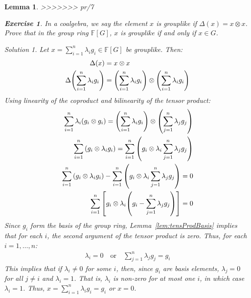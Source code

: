 \documentclass{article}
\newtheorem{Lemma}{Lemma}
\theoremstyle{definition}
\newtheorem{Exercise}{Exercise}
\theoremstyle{remark}
\newtheorem*{Solution*}{Solution}
\theoremstyle{underline}
\theoremstyle{underline}
\begin{document}
\begin{Lemma}
>>>>>>> pr/7
	\begin{Exercise}
		In a coalgebra, we say the element $x$ is grouplike if $\Delta(x) = x \otimes x$. Prove that in the group ring $\mathbb F[G]$, $x$ is grouplike if and only if $x \in G$.
	\end{Exercise}
	\begin{Solution*}
		Let $x = \sum\limits_{i = 1}^n \lambda_i g_i \in \mathbb F[G]$ be grouplike. Then:
		\begin{align*}
			\Delta(x) & = x \otimes x \\
			\Delta\pqty{\sum_{i=1}^n \lambda_i g_i} & = \pqty{\sum_{i=1}^n \lambda_i g_i} \otimes \pqty{\sum_{i=1}^n \lambda_i g_i}
		\end{align*}
		Using linearity of the coproduct and bilinearity of the tensor product:
		\begin{align*}
			\sum_{i=1}^n \lambda_i \pqty{g_i \otimes g_i} = \pqty{\sum_{i=1}^n \lambda_i g_i} \otimes \pqty{\sum_{j=1}^n \lambda_j g_j}\\
			\sum_{i=1}^n \pqty{g_i \otimes \lambda_i g_i} = \sum_{i=1}^n \pqty{g_i \otimes \lambda_i \sum_{j=1}^n \lambda_j g_j}\\
			\sum_{i=1}^n  \pqty{ g_i \otimes \lambda_i g_i} - \sum_{i=1}^n  \pqty{ g_i \otimes \lambda_i \sum_{j=1}^n \lambda_j g_j} = 0 \\
			\sum_{i=1}^n  \bqty{g_i \otimes \lambda_i\pqty{g_i - \sum_{j=1}^n \lambda_j g_j}} = 0
		\end{align*}
		Since $g_i$ form the basis of the group ring, Lemma~\ref{lem:tensProdBasis} implies that for each $i$, the second argument of the tensor product is zero. Thus, for each $i = 1, \ldots, n$:
		\begin{gather*}
			\lambda_i = 0 \quad \text{or} \quad \sum_{j=1}^n \lambda_j g_j = g_i
		\end{gather*}
		This implies that if $\lambda_i \ne 0$ for some $i$, then, since $g_i$ are basis elements, $\lambda_j = 0$ for all $j \ne i$ and $\lambda_i = 1$. That is, $\lambda_i$ is non-zero for at most one $i$, in which case $\lambda_i = 1$. Thus, $x = \sum_{i = 1}^n \lambda_i g_i = g_i$ or $x = 0$.
	\end{Solution*}


\end{Lemma}
\end{document}
